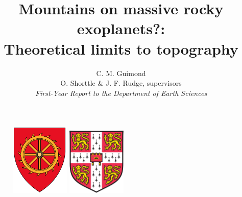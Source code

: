 \documentclass[10pt,a4paper]{article}
\author{C. M. Guimond \\ \normalsize O. Shorttle \& J. F. Rudge, supervisors \\ \textit{First-Year Report to the Department of Earth Sciences}}
\title{Mountains on massive rocky exoplanets?: \\ \large Theoretical limits to topography}
\begin{document}
\begin{figure}
    \centering
    \begin{minipage}{0.5\textwidth}
        \centering
        \includegraphics[width=0.25\textwidth]{cats} %
    \end{minipage}\hfill
    \begin{minipage}{0.5\textwidth}
        \centering
        \includegraphics[width=0.25\textwidth]{cam} %
    \end{minipage}
\end{figure}

\maketitle

\linenumbers



\tableofcontents








\end{document}
